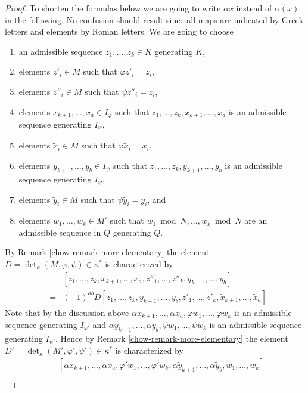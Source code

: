 \begin{proof}
\medskip\noindent
To shorten the formulas below we are going to write $\alpha x$ instead
of $\alpha(x)$ in the following. No confusion should result since
all maps are indicated by Greek letters and elements by Roman letters.
We are going to choose
\begin{enumerate}
\item an admissible sequence $z_1, \ldots, z_k \in K$
generating $K$,
\item elements $z'_i \in M$ such that $\varphi z'_i = z_i$,
\item elements $z''_i \in M$ such that $\psi z''_i = z_i$,
\item elements $x_{k + 1}, \ldots, x_a \in I_\varphi$ such
that $z_1, \ldots, z_k, x_{k + 1}, \ldots, x_a$ is an admissible
sequence generating $I_\varphi$,
\item elements $\tilde x_i \in M$ such that $\varphi \tilde x_i = x_i$,
\item elements $y_{k + 1}, \ldots, y_b \in I_\psi$ such that
$z_1, \ldots, z_k, y_{k + 1}, \ldots, y_b$ is an admissible
sequence generating $I_\psi$,
\item elements $\tilde y_i \in M$ such that $\psi \tilde y_i = y_i$, and
\item elements $w_1, \ldots, w_k \in M'$ such that
$w_1 \bmod N, \ldots, w_k \bmod N$ are an admissible sequence
in $Q$ generating $Q$.
\end{enumerate}
By Remark \ref{chow-remark-more-elementary} the element
$D = \det_\kappa(M, \varphi, \psi) \in \kappa^*$ is
characterized by
\begin{eqnarray*}
& &
[z_1, \ldots, z_k,
x_{k + 1}, \ldots, x_a,
z''_1, \ldots, z''_k,
\tilde y_{k + 1}, \ldots, \tilde y_b] \\
& = &
(-1)^{ab} D
[z_1, \ldots, z_k,
y_{k + 1}, \ldots, y_b,
z'_1, \ldots, z'_k,
\tilde x_{k + 1}, \ldots, \tilde x_a]
\end{eqnarray*}
Note that by the discussion above
$\alpha x_{k + 1}, \ldots, \alpha x_a, \varphi w_1, \ldots, \varphi w_k$
is an admissible sequence generating $I_{\varphi'}$ and
$\alpha y_{k + 1}, \ldots, \alpha y_b, \psi w_1, \ldots, \psi w_k$
is an admissible sequence generating $I_{\psi'}$.
Hence by Remark \ref{chow-remark-more-elementary} the element
$D' = \det_\kappa(M', \varphi', \psi') \in \kappa^*$ is
characterized by
\begin{eqnarray*}
& &
[\alpha x_{k + 1}, \ldots, \alpha x_a,
\varphi' w_1, \ldots, \varphi' w_k,
\alpha \tilde y_{k + 1}, \ldots, \alpha \tilde y_b,
w_1, \ldots, w_k]
\\

\end{eqnarray*}
\end{proof}
